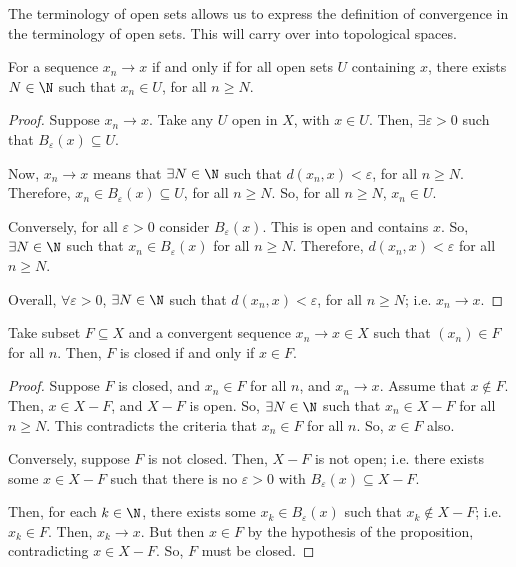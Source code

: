 \documentclass[draft]{penrose}
\newcommand{\oB}{B}
\begin{document}
The terminology of open sets allows us to express the definition of convergence in the terminology of open sets. This will carry over into topological spaces.
\begin{nlemma}
  For a sequence $x_n \to x$ if and only if for all open sets $U$ containing $x$, there exists $N \in \N$ such that $x_n \in U$, for all $n \geq N$.
\end{nlemma}
\begin{proof}
  Suppose $x_n \to x$. Take any $U$ open in $X$, with $x \in U$. Then, $\exists \varepsilon>0$ such that $\oB_{\varepsilon}(x) \subseteq U$.

  Now, $x_n \to x$ means that $\exists N \in \N$ such that $d(x_n, x) < \varepsilon$, for all $n \geq N$. Therefore, $x_n \in \oB_{\varepsilon}(x) \subseteq U$, for all $n \geq N$. So, for all $n \geq N$, $x_n \in U$.

  Conversely, for all $\varepsilon>0$ consider $\oB_{\varepsilon}(x)$. This is open and contains $x$. So, $\exists N \in \N$ such that $x_n \in \oB_{\varepsilon}(x)$ for all $n \geq N$. Therefore, $d(x_n, x) < \varepsilon$ for all $n \geq N$.

  Overall, $\forall \varepsilon>0$, $\exists N \in \N$ such that $d(x_n, x) < \varepsilon$, for all $n \geq N$; i.e. $x_n \to x$.
\end{proof}

\begin{nprop}
  Take subset $F \subseteq X$ and a convergent sequence $x_n \to x \in X$ such that $(x_n) \in F$ for all $n$. Then, $F$ is closed if and only if $x \in F$.
\end{nprop}
\begin{proof}
  Suppose $F$ is closed, and $x_n \in F$ for all $n$, and $x_n \to x$. Assume that $x \notin F$. Then, $x \in X-F$, and $X-F$ is open. So, $\exists N \in \N$ such that $x_n \in X-F$ for all $n \geq N$. This contradicts the criteria that $x_n \in F$ for all $n$. So, $x \in F$ also.

  Conversely, suppose $F$ is not closed. Then, $X-F$ is not open; i.e. there exists some $x \in X-F$ such that there is no $\varepsilon>0$ with $\oB_{\varepsilon}(x) \subseteq X - F$.

  Then, for each $k \in \N$, there exists some $x_k \in \oB_{\varepsilon}(x)$ such that $x_k \notin X-F$; i.e. $x_k \in F$. Then, $x_k \to x$. But then $x \in F$ by the hypothesis of the proposition, contradicting $x \in X-F$. So, $F$ must be closed.
\end{proof}
\end{document}
